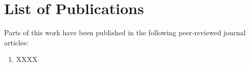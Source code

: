 \chapter*{List of Publications}

Parts of this work have been published in the following peer-reviewed journal articles:

\begin{enumerate}
    \item XXXX

\end{enumerate}


